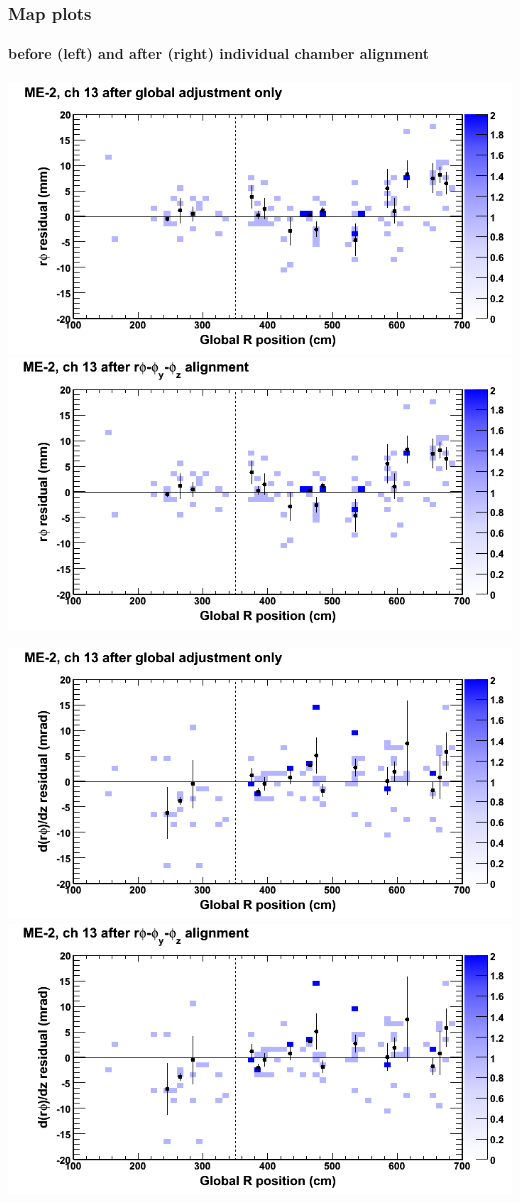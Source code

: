 \documentclass[compress]{beamer}
\begin{document}
\begin{frame}
\frametitle{Map plots}
\framesubtitle{before (left) and after (right) individual chamber alignment}
\includegraphics[width=0.5\linewidth]{ringmapplots_3dof/before_CSCvsr_mem2ch13_x.png} \includegraphics[width=0.5\linewidth]{ringmapplots_3dof/after_CSCvsr_mem2ch13_x.png}

\includegraphics[width=0.5\linewidth]{ringmapplots_3dof/before_CSCvsr_mem2ch13_dxdz.png} \includegraphics[width=0.5\linewidth]{ringmapplots_3dof/after_CSCvsr_mem2ch13_dxdz.png}
\end{frame}
\end{document}
